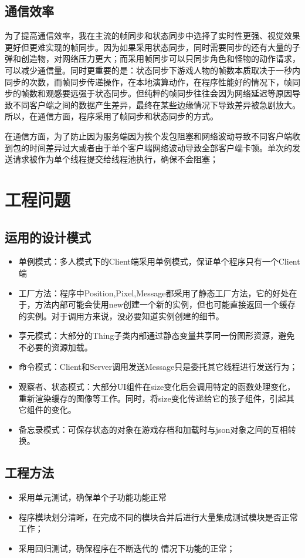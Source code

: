 \documentclass{SCIS2022cn}
\begin{document}
\subsection{通信效率}
为了提高通信效率，我在主流的帧同步和状态同步中选择了实时性更强、视觉效果更好但更难实现的帧同步。因为如果采用状态同步，同时需要同步的还有大量的子弹和创造物，对网络压力更大；而采用帧同步可以只同步角色和怪物的动作请求，可以减少通信量。同时更重要的是：状态同步下游戏人物的帧数本质取决于一秒内同步的次数，而帧同步传递操作，在本地演算动作，在程序性能好的情况下，帧同步的帧数和观感要远强于状态同步。但纯粹的帧同步往往会因为网络延迟等原因导致不同客户端之间的数据产生差异，最终在某些边缘情况下导致差异被急剧放大。所以，在通信方面，程序采用了帧同步和状态同步的方式。\par 
在通信方面，为了防止因为服务端因为挨个发包阻塞和网络波动导致不同客户端收到包的时间差异过大或者由于单个客户端网络波动导致全部客户端卡顿。单次的发送请求被作为单个线程提交给线程池执行，确保不会阻塞；\par 
\section{工程问题}
\subsection{运用的设计模式}
\begin{itemize}
	\item 单例模式：多人模式下的Client端采用单例模式，保证单个程序只有一个Client端
	\item 工厂方法：程序中Position,Pixel,Message都采用了静态工厂方法，它的好处在于，方法内部可能会使用new创建一个新的实例，但也可能直接返回一个缓存的实例。对于调用方来说，没必要知道实例创建的细节。
	\item 享元模式：大部分的Thing子类内部通过静态变量共享同一份图形资源，避免不必要的资源加载。
	\item 命令模式：Client和Server调用发送Message只是委托其它线程进行发送行为；
	\item 观察者、状态模式：大部分UI组件在size变化后会调用特定的函数处理变化，重新渲染缓存的图像等工作。同时，将size变化传递给它的孩子组件，引起其它组件的变化。
	\item 备忘录模式：可保存状态的对象在游戏存档和加载时与json对象之间的互相转换。
\end{itemize}
\subsection{工程方法}
\begin{itemize}
	\item 采用单元测试，确保单个子功能功能正常
	\item 程序模块划分清晰，在完成不同的模块合并后进行大量集成测试模块是否正常工作；
	\item 采用回归测试，确保程序在不断迭代的 情况下功能的正常；
\end{itemize}
\end{document}
